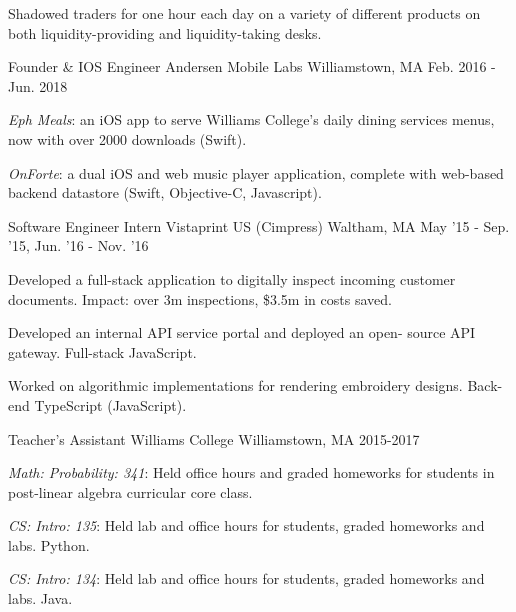 \begin{cventries}
{\begin{cvitems}
          \item {Shadowed traders for one hour each day on a variety of different products on both liquidity-providing and liquidity-taking desks.}
        \end{cvitems}
      }
    \cventry
      {Founder \& IOS Engineer} %
      {Andersen Mobile Labs} %
      {Williamstown, MA} %
      {Feb. 2016 - Jun. 2018} %
      {
        \begin{cvitems} %
          \item {\textit{Eph Meals}: an iOS app to serve Williams College's daily dining services menus, now with over 2000 downloads (Swift).}
          \item {\textit{OnForte}: a dual iOS and web music player application, complete with web-based backend datastore (Swift, Objective-C, Javascript).}
        \end{cvitems}
      }

  \cventry
    {Software Engineer Intern} %
    {Vistaprint US (Cimpress)} %
    {Waltham, MA} %
    {May '15 - Sep. '15, Jun. '16 - Nov. '16} %
    {
      \begin{cvitems} %
        \item {Developed a full-stack application to digitally inspect incoming customer documents. Impact: over 3m inspections, \$3.5m in costs saved.}
        \item {Developed an internal API service portal and deployed an open- source API gateway. Full-stack JavaScript. }
        \item {Worked on algorithmic implementations for rendering embroidery designs. Back-end TypeScript (JavaScript).}
      \end{cvitems}
    }
\cventry
{Teacher's Assistant}
{Williams College}
{Williamstown, MA}
{2015-2017}
{
\begin{cvitems}
\item \textit{Math: Probability: 341}: Held office hours and graded homeworks for students in post-linear algebra curricular core class.
\item \textit{CS: Intro: 135}: Held lab and office hours for students, graded homeworks and labs. Python.
\item \textit{CS: Intro: 134}: Held lab and office hours for students, graded homeworks and labs. Java.
\end{cvitems}
}

\end{cventries}
